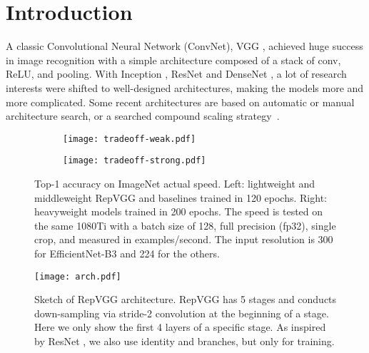 \documentclass[final]{cvpr}
\begin{document}
\section{Introduction}

A classic Convolutional Neural Network (ConvNet), VGG \cite{simonyan2014very}, achieved huge success in image recognition with a simple architecture composed of a stack of conv, ReLU, and pooling. With Inception \cite{szegedy2015going,szegedy2016rethinking,szegedy2017inception,ioffe2015batch}, ResNet \cite{he2016deep} and DenseNet \cite{huang2017densely}, a lot of research interests were shifted to well-designed architectures, making the models more and more complicated. Some recent architectures are based on automatic \cite{zoph2018learning,real2019regularized,liu2018progressive} or manual \cite{regnet} architecture search, or a searched compound scaling strategy~\cite{efficientnet}.

\begin{figure}
	\begin{subfigure}{0.49\linewidth}
		\texttt{[image: tradeoff-weak.pdf]}
		\label{fig-tradeoff-weak} 
	\end{subfigure}
	\begin{subfigure}{0.49\linewidth}
		\texttt{[image: tradeoff-strong.pdf]}
		\label{fig-tradeoff-strong} 
	\end{subfigure}
	\vskip -0.2in
	\caption{Top-1 accuracy on ImageNet \vs actual speed. Left: lightweight and middleweight RepVGG and baselines trained in 120 epochs. Right: heavyweight models trained in 200 epochs. The speed is tested on the same 1080Ti with a batch size of 128, full precision (fp32), single crop, and measured in examples/second. The input resolution is 300 for EfficientNet-B3 \cite{efficientnet} and 224 for the others.}
	\label{fig-tradeoff}
	\vskip -0.15in
\end{figure}
\begin{figure}
	\begin{center}
		\texttt{[image: arch.pdf]}
		\vspace{-0.10in}
		\caption{Sketch of RepVGG architecture. RepVGG has 5 stages and conducts down-sampling via stride-2 convolution at the beginning of a stage. Here we only show the first 4 layers of a specific stage. As inspired by ResNet \cite{he2016deep}, we also use identity and  branches, but only for training.}
		\label{fig-arch}
		\vspace{-0.2in}
	\end{center}
\end{figure}
\end{document}
